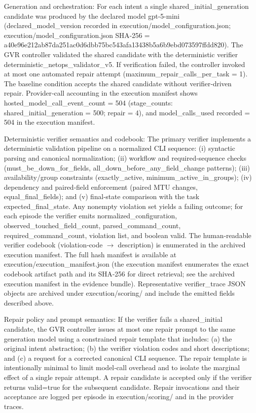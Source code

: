 \documentclass[conference]{IEEEtran}
\begin{document}
Generation and orchestration: For each intent a single shared\_initial\_generation candidate was produced by the declared model gpt-5-mini (declared\_model\_version recorded in execution/model\_configuration.json; execution/model\_configuration.json SHA‑256 = a40e96e2\allowbreak{}12ab87da\allowbreak{}251ac0d6\allowbreak{}dbb75bc5\allowbreak{}43afa134\allowbreak{}38b5a6b9\allowbreak{}ebd07359\allowbreak{}7ffdd820). The GVR controller validated the shared candidate with the deterministic verifier deterministic\_netops\_validator\_v5. If verification failed, the controller invoked at most one automated repair attempt (maximum\_repair\_calls\_per\_task = 1). The baseline condition accepts the shared candidate without verifier‑driven repair. Provider‑call accounting in the execution manifest shows hosted\_model\_call\_event\_count = 504 (stage\_counts: shared\_initial\_generation = 500; repair = 4), and model\_calls\_used recorded = 504 in the execution manifest.

Deterministic verifier semantics and codebook: The primary verifier implements a deterministic validation pipeline on a normalized CLI sequence: (i) syntactic parsing and canonical normalization; (ii) workflow and required‑sequence checks (must\_be\_down\_for\_fields, all\_down\_before\_any\_field\_change patterns); (iii) availability/group constraints (exactly\_active, minimum\_active\_in\_groups); (iv) dependency and paired‑field enforcement (paired MTU changes, equal\_final\_fields); and (v) final‑state comparison with the task expected\_final\_state. Any nonempty violation set yields a failing outcome; for each episode the verifier emits normalized\_configuration, observed\_touched\_field\_count, parsed\_command\_count, required\_command\_count, violation list, and boolean valid. The human‑readable verifier codebook (violation‑code \ensuremath{\rightarrow} description) is enumerated in the archived execution manifest. The full hash manifest is available at execution/execution\_manifest.json (the execution manifest enumerates the exact codebook artifact path and its SHA‑256 for direct retrieval; see the archived execution manifest in the evidence bundle). Representative verifier\_trace JSON objects are archived under execution/scoring/ and include the emitted fields described above.

Repair policy and prompt semantics: If the verifier fails a shared\_initial candidate, the GVR controller issues at most one repair prompt to the same generation model using a constrained repair template that includes: (a) the original intent abstraction; (b) the verifier violation codes and short descriptions; and (c) a request for a corrected canonical CLI sequence. The repair template is intentionally minimal to limit model‑call overhead and to isolate the marginal effect of a single repair attempt. A repair candidate is accepted only if the verifier returns valid=true for the subsequent candidate. Repair invocations and their acceptance are logged per episode in execution/scoring/ and in the provider traces.
\end{document}
